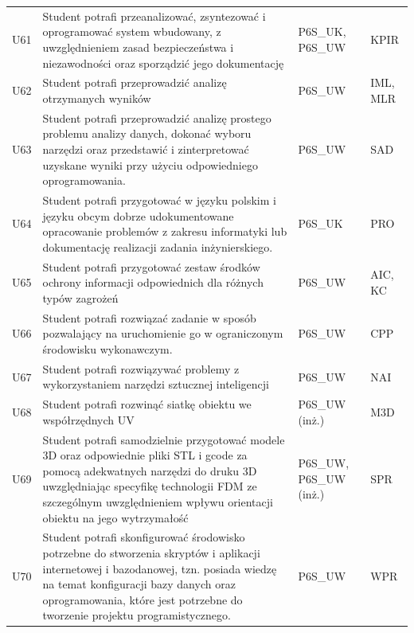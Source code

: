\documentclass[12pt,a4paper]{article}
\begin{document}
{\begin{longtable}{m{1cm}m{8.8cm}m{2.1cm}m{2.5cm}}
\rowcolor{tableRowLight} U61 & Student potrafi przeanalizować, zsyntezować i oprogramować system wbudowany, z uwzględnieniem zasad bezpieczeństwa i niezawodności oraz sporządzić jego dokumentację & {\scriptsize P6S\_UK, P6S\_UW} & {\scriptsize KPIR} \\
\rowcolor{tableRowAlt} U62 & Student potrafi przeprowadzić analizę otrzymanych wyników & {\scriptsize P6S\_UW} & {\scriptsize IML, MLR} \\
\rowcolor{tableRowLight} U63 & Student potrafi przeprowadzić analizę prostego problemu analizy danych, dokonać wyboru narzędzi oraz przedstawić i zinterpretować uzyskane wyniki przy użyciu odpowiedniego oprogramowania. & {\scriptsize P6S\_UW} & {\scriptsize SAD} \\
\rowcolor{tableRowAlt} U64 & Student potrafi przygotować w języku polskim i języku obcym dobrze udokumentowane opracowanie problemów z zakresu informatyki lub dokumentację realizacji zadania inżynierskiego. & {\scriptsize P6S\_UK} & {\scriptsize PRO} \\
\rowcolor{tableRowLight} U65 & Student potrafi przygotować zestaw środków ochrony informacji odpowiednich dla różnych typów zagrożeń & {\scriptsize P6S\_UW} & {\scriptsize AIC, KC} \\
\rowcolor{tableRowAlt} U66 & Student potrafi rozwiązać zadanie w sposób pozwalający na uruchomienie go w ograniczonym środowisku wykonawczym. & {\scriptsize P6S\_UW} & {\scriptsize CPP} \\
\rowcolor{tableRowLight} U67 & Student potrafi rozwiązywać problemy z wykorzystaniem narzędzi sztucznej inteligencji & {\scriptsize P6S\_UW} & {\scriptsize NAI} \\
\rowcolor{tableRowAlt} U68 & Student potrafi rozwinąć siatkę obiektu we współrzędnych UV & {\scriptsize P6S\_UW {\scriptsize (inż.)}} & {\scriptsize M3D} \\
\rowcolor{tableRowLight} U69 & Student potrafi samodzielnie przygotować modele 3D oraz odpowiednie pliki STL i gcode za pomocą adekwatnych narzędzi do druku 3D uwzględniając specyfikę technologii FDM ze szczególnym uwzględnieniem wpływu orientacji obiektu na jego wytrzymałość & {\scriptsize P6S\_UW, P6S\_UW {\scriptsize (inż.)}} & {\scriptsize SPR} \\
\rowcolor{tableRowAlt} U70 & Student potrafi skonfigurować środowisko potrzebne do stworzenia skryptów i aplikacji internetowej i bazodanowej, tzn. posiada wiedzę na temat konfiguracji bazy danych oraz oprogramowania, które jest potrzebne do tworzenie projektu programistycznego. & {\scriptsize P6S\_UW} & {\scriptsize WPR} \\

\end{longtable}}
\end{document}
